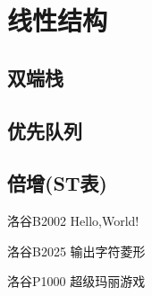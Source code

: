 \chapter{线性结构}
\section{双端栈}
\section{优先队列}
\section{倍增(ST表)}


\begin{problemset}
\item 洛谷B2002 Hello,World!
\item 洛谷B2025 输出字符菱形
\item 洛谷P1000 超级玛丽游戏
\end{problemset}


